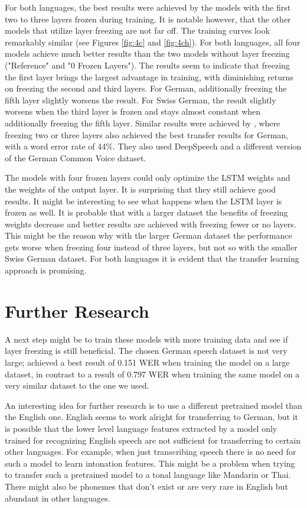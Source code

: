 \documentclass[11pt]{article}
\begin{document}
For both languages, the best results were achieved by the models with the first two to three layers frozen during training. It is notable however, that the other models that utilize layer freezing are not far off. The training curves look remarkably similar (see Figures \ref{fig:4c} and \ref{fig:4ch}). For both languages, all four models achieve much better results than the two models without layer freezing ("Reference" and "0 Frozen Layers"). The results seem to indicate that freezing the first layer brings the largest advantage in training, with diminishing returns on freezing the second and third layers. For German, additionally freezing the fifth layer slightly worsens the result. For Swiss German, the result slightly worsens when the third layer is frozen and stays almost constant when additionally freezing the fifth layer. Similar results were achieved by \textcite{DBLP:conf/lrec/ArdilaBDKMHMSTW20}, where freezing two or three layers also achieved the best transfer results for German, with a word error rate of 44\%. They also used DeepSpeech and a different version of the German Common Voice dataset.

The models with four frozen layers could only optimize the LSTM weights and the weights of the output layer. It is surprising that they still achieve good results. It might be interesting to see what happens when the LSTM layer is frozen as well. It is probable that with a larger dataset the benefits of freezing weights decrease and better results are achieved with freezing fewer or no layers. This might be the reason why with the larger German dataset the performance gets worse when freezing four instead of three layers, but not so with the smaller Swiss German dataset. For both languages it is evident that the transfer learning approach is promising.

\section{Further Research}
A next step might be to train these models with more training data and see if layer freezing is still beneficial. The chosen German speech dataset is not very large; \textcite{agarwal-zesch-2019-german} achieved a best result of 0.151 WER when training the model on a large dataset, in contrast to a result of 0.797 WER when training the same model on a very similar dataset to the one we used.

An interesting idea for further research is to use a different pretrained model than the English one. English seems to work alright for transferring to German, but it is possible that the lower level language features extracted by a model only trained for recognizing English speech are not sufficient for transferring to certain other languages. For example, when just transcribing speech there is no need for such a model to learn intonation features. This might be a problem when trying to transfer such a pretrained model to a tonal language like Mandarin or Thai. There might also be phonemes that don't exist or are very rare in English but abundant in other languages. 
\end{document}
